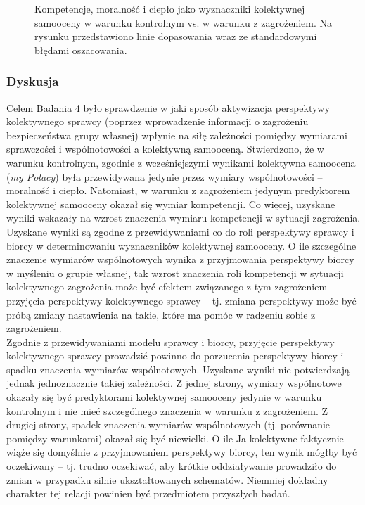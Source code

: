 \documentclass[man]{apa6}
\begin{document}
\begin{figure*}[htbp]
   \centering
   \caption{Kompetencje, moralność i ciepło jako wyznaczniki kolektywnej samooceny w warunku kontrolnym vs. w warunku z zagrożeniem. Na rysunku przedstawiono linie dopasowania wraz ze standardowymi błędami oszacowania.}
   \label{fig:study4}
\end{figure*}

\subsubsection{Dyskusja}
Celem Badania 4 było sprawdzenie w jaki sposób aktywizacja perspektywy kolektywnego sprawcy (poprzez wprowadzenie informacji o zagrożeniu bezpieczeństwa grupy własnej) wpłynie na siłę zależności pomiędzy wymiarami sprawczości i wspólnotowości a kolektywną samooceną. Stwierdzono, że w warunku kontrolnym, zgodnie z wcześniejszymi wynikami kolektywna samoocena (\emph{my Polacy}) była przewidywana jedynie przez wymiary wspólnotowości -- moralność i ciepło. Natomiast, w warunku z zagrożeniem jedynym predyktorem kolektywnej samooceny okazał się wymiar kompetencji. Co więcej, uzyskane wyniki wskazały na wzrost znaczenia wymiaru kompetencji w sytuacji zagrożenia.\\

Uzyskane wyniki są zgodne z przewidywaniami co do roli perspektywy sprawcy i biorcy w determinowaniu wyznaczników kolektywnej samooceny. O ile szczególne znaczenie wymiarów wspólnotowych wynika z przyjmowania perspektywy biorcy w myśleniu o grupie własnej, tak wzrost znaczenia roli kompetencji w sytuacji kolektywnego zagrożenia może być efektem związanego z tym zagrożeniem przyjęcia perspektywy kolektywnego sprawcy -- tj. zmiana perspektywy może być próbą zmiany nastawienia na takie, które ma pomóc w radzeniu sobie z zagrożeniem.\\

Zgodnie z przewidywaniami modelu sprawcy i biorcy, przyjęcie perspektywy kolektywnego sprawcy prowadzić powinno do porzucenia perspektywy biorcy i spadku znaczenia wymiarów wspólnotowych. Uzyskane wyniki nie potwierdzają jednak jednoznacznie takiej zależności. Z jednej strony, wymiary wspólnotowe okazały się być predyktorami kolektywnej samooceny jedynie w warunku kontrolnym i nie mieć szczególnego znaczenia w warunku z zagrożeniem. Z drugiej strony, spadek znaczenia wymiarów wspólnotowych (tj. porównanie pomiędzy warunkami) okazał się być niewielki. O ile Ja kolektywne faktycznie wiąże się domyślnie z przyjmowaniem perspektywy biorcy, ten wynik mógłby być oczekiwany -- tj. trudno oczekiwać, aby krótkie oddziaływanie prowadziło do zmian w przypadku silnie ukształtowanych schematów. Niemniej dokładny charakter tej relacji powinien być przedmiotem przyszłych badań. \\
\end{document}
